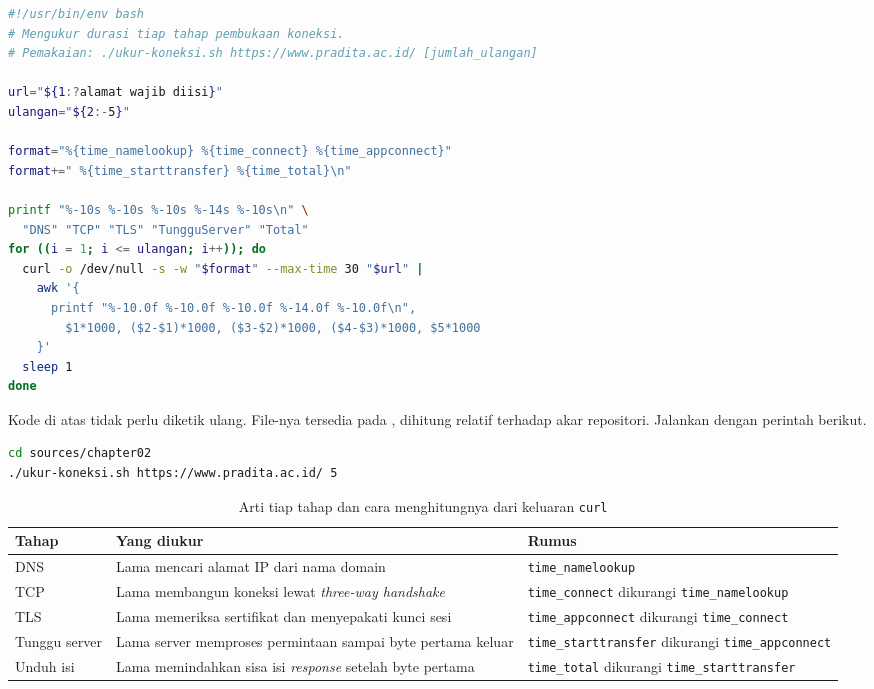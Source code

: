 \begin{lstlisting}[language=bash, caption={Skrip pengukur tiap tahap pembukaan koneksi, tersedia di \berkas{sources/chapter02/ukur-koneksi.sh}}, label={lst:lat1}]
#!/usr/bin/env bash
# Mengukur durasi tiap tahap pembukaan koneksi.
# Pemakaian: ./ukur-koneksi.sh https://www.pradita.ac.id/ [jumlah_ulangan]

url="${1:?alamat wajib diisi}"
ulangan="${2:-5}"

format="%{time_namelookup} %{time_connect} %{time_appconnect}"
format+=" %{time_starttransfer} %{time_total}\n"

printf "%-10s %-10s %-10s %-14s %-10s\n" \
  "DNS" "TCP" "TLS" "TungguServer" "Total"
for ((i = 1; i <= ulangan; i++)); do
  curl -o /dev/null -s -w "$format" --max-time 30 "$url" |
    awk '{
      printf "%-10.0f %-10.0f %-10.0f %-14.0f %-10.0f\n",
        $1*1000, ($2-$1)*1000, ($3-$2)*1000, ($4-$3)*1000, $5*1000
    }'
  sleep 1
done
\end{lstlisting}

Kode di atas tidak perlu diketik ulang. File-nya tersedia pada
, dihitung relatif terhadap akar
repositori. Jalankan dengan perintah berikut.

\begin{lstlisting}[language=bash, caption={Menjalankan skrip pengukur koneksi}, label={lst:lat1-jalan}]
cd sources/chapter02
./ukur-koneksi.sh https://www.pradita.ac.id/ 5
\end{lstlisting}

\begin{table}[!htb]
  \centering
  \caption{Arti tiap tahap dan cara menghitungnya dari keluaran \texttt{curl}}
  \label{tab:lat1-rumus}
  \begin{tabularx}{\textwidth}{lXX}
    \hline
    \textbf{Tahap} & \textbf{Yang diukur} & \textbf{Rumus} \\
    \hline
    DNS & Lama mencari alamat IP dari nama domain & \texttt{time\_namelookup} \\
    \hline
    TCP & Lama membangun koneksi lewat \textit{three-way handshake} & \texttt{time\_connect} dikurangi \texttt{time\_namelookup} \\
    \hline
    TLS & Lama memeriksa sertifikat dan menyepakati kunci sesi & \texttt{time\_appconnect} dikurangi \texttt{time\_connect} \\
    \hline
    Tunggu server & Lama server memproses permintaan sampai byte pertama keluar & \texttt{time\_starttransfer} dikurangi \texttt{time\_appconnect} \\
    \hline
    Unduh isi & Lama memindahkan sisa isi \textit{response} setelah byte pertama & \texttt{time\_total} dikurangi \texttt{time\_starttransfer} \\
    \hline
  \end{tabularx}
\end{table}

